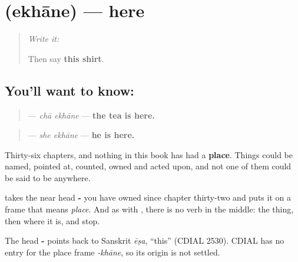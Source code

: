 \section[\texorpdfstring{\bn{এখানে} (ekhāne)}{এখানে (ekhāne)}]{ (ekhāne) — here}

\label{lesson:BN-C26-ekhane}



\begin{quote}
\emph{Write it:} \textbf{}

Then say \textbf{this shirt}.
\end{quote}

\subsection*{You'll want to know: }
\begin{quote}
\textbf{ } — \emph{chā ekhāne} — \textbf{the tea is here.}
\end{quote}

\begin{quote}
\textbf{ } — \emph{she ekhāne} — \textbf{he is here.}
\end{quote}

Thirty-six chapters, and nothing in this book has had a \textbf{place}. Things could be named, pointed at, counted, owned and acted upon, and not one of them could be said to be anywhere.

\textbf{} takes the near head \textbf{-} you have owned since chapter thirty-two and puts it on a frame that means \emph{place}. And as with \textbf{ }, there is no verb in the middle: the thing, then where it is, and stop.

\begin{cousinweb}
The head \textbf{-} points back to Sanskrit \emph{ēṣa}, \textquotedblleft{}this\textquotedblright{} (CDIAL 2530). CDIAL has no entry for the place frame \emph{-khāne}, so its origin is not settled.
\end{cousinweb}

